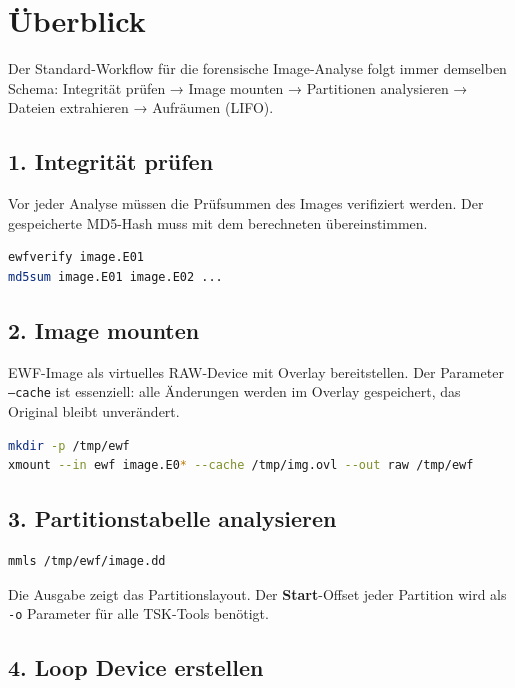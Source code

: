\section{Überblick}

Der Standard-Workflow für die forensische Image-Analyse folgt immer demselben Schema:
Integrität prüfen → Image mounten → Partitionen analysieren → Dateien extrahieren → Aufräumen (LIFO).

\subsection{1. Integrität prüfen}

Vor jeder Analyse müssen die Prüfsummen des Images verifiziert werden.
Der gespeicherte MD5-Hash muss mit dem berechneten übereinstimmen.

\begin{lstlisting}[language=bash]
ewfverify image.E01
md5sum image.E01 image.E02 ...
\end{lstlisting}

\subsection{2. Image mounten}

EWF-Image als virtuelles RAW-Device mit Overlay bereitstellen.
Der Parameter \texttt{--cache} ist essenziell: alle Änderungen werden im Overlay gespeichert, das Original bleibt unverändert.

\begin{lstlisting}[language=bash]
mkdir -p /tmp/ewf
xmount --in ewf image.E0* --cache /tmp/img.ovl --out raw /tmp/ewf
\end{lstlisting}

\subsection{3. Partitionstabelle analysieren}

\begin{lstlisting}[language=bash]
mmls /tmp/ewf/image.dd
\end{lstlisting}

Die Ausgabe zeigt das Partitionslayout.
Der \textbf{Start}-Offset jeder Partition wird als \texttt{-o} Parameter für alle TSK-Tools benötigt.

\subsection{4. Loop Device erstellen}

